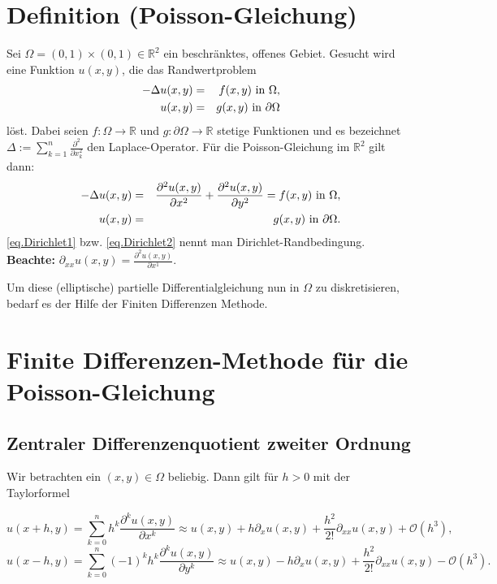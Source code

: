 \section{Definition (Poisson-Gleichung)}\label{s.Poisson-Gleichung}

Sei $\Omega = (0,1)\times(0,1) \in \mathbb{R}^{2}$ ein beschränktes, offenes Gebiet. Gesucht wird eine Funktion $u(x,y)$, die das Randwertproblem
\begin{eqnarray}
-\Delta u(x,y) &=& f(x,y) \textnormal{ in } \Omega, \\
u(x,y) &=& g(x,y) \textnormal{ in } \partial \Omega\label{eq.Dirichlet1}
\end{eqnarray}
löst.
Dabei seien $f: \Omega \rightarrow \mathbb{R}$ und $g: \partial\Omega \rightarrow \mathbb{R}$ stetige Funktionen und es bezeichnet $\Delta := \sum\limits_{k=1}^{n} \frac {\partial^{2}} {\partial x_{k}^{2}}$ den Laplace-Operator. Für die Poisson-Gleichung im $\mathbb{R}^{2}$ gilt dann:
\begin{eqnarray}
-\Delta u(x,y) &=& \frac {\partial^{2} u(x,y)} {\partial x^{2}} + \frac {\partial^{2} u(x,y)} {\partial y^{2}} = f(x,y) \textnormal{ in } \Omega, \\
u(x,y) &=& g(x,y) \textnormal{ in } \partial \Omega.\label{eq.Dirichlet2}
\end{eqnarray}
\autoref{eq.Dirichlet1} bzw. \autoref{eq.Dirichlet2} nennt man Dirichlet-Randbedingung.\\

\textbf{Beachte:} $\partial_{xx}u(x,y) = \frac {\partial^{2}u(x,y)} {\partial x^{1}}$.

Um diese (elliptische) partielle Differentialgleichung nun in $\Omega$ zu diskretisieren, bedarf es der Hilfe der Finiten Differenzen Methode.

\section{Finite Differenzen-Methode für die Poisson-Gleichung}\label{s.Finite Differenzen}

\subsection{Zentraler Differenzenquotient zweiter Ordnung}\label{ss.Differenzenquotient zweiter Ordnung}

Wir betrachten ein $(x,y) \in \Omega$ beliebig. Dann gilt für $h > 0$ mit der Taylorformel

\begin{equation}
u(x+h,y) = \sum_{k = 0}^{n} h^{k} \frac {\partial^{k}u(x,y)} {\partial x^{k}} \approx u(x,y) + h \partial_{x} u(x,y) + \frac {h^{2}} {2!} \partial_{xx} u(x,y) + \mathcal{O}(h^{3}),\label{eq.Partiall x+h}
\end{equation}
\begin{equation}
u(x-h,y) = \sum_{k = 0}^{n} (-1)^{k} h^{k} \frac {\partial^{k}u(x,y)} {\partial y^{k}} \approx u(x,y) - h \partial_{x} u(x,y) + \frac {h^{2}} {2!} \partial_{xx} u(x,y) - \mathcal{O}(h^{3}).\label{eq.Partiall x-h}
\end{equation}

